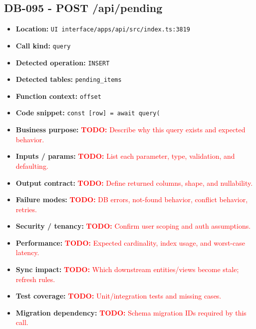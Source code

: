 \documentclass[11pt]{article}
\newcommand{\todoitem}[1]{\textcolor{red}{\textbf{TODO:} #1}}
\begin{document}
\subsection{DB-095 - POST /api/pending}
\begin{itemize}[leftmargin=1.5em]
\item \textbf{Location:} \texttt{UI interface/apps/api/src/index.ts:3819}
\item \textbf{Call kind:} \texttt{query}
\item \textbf{Detected operation:} \texttt{INSERT}
\item \textbf{Detected tables:} \texttt{pending\_items}
\item \textbf{Function context:} \texttt{offset}
\item \textbf{Code snippet:} \texttt{const [row] = await query(}
\item \textbf{Business purpose:} \todoitem{Describe why this query exists and expected behavior.}
\item \textbf{Inputs / params:} \todoitem{List each parameter, type, validation, and defaulting.}
\item \textbf{Output contract:} \todoitem{Define returned columns, shape, and nullability.}
\item \textbf{Failure modes:} \todoitem{DB errors, not-found behavior, conflict behavior, retries.}
\item \textbf{Security / tenancy:} \todoitem{Confirm user scoping and auth assumptions.}
\item \textbf{Performance:} \todoitem{Expected cardinality, index usage, and worst-case latency.}
\item \textbf{Sync impact:} \todoitem{Which downstream entities/views become stale; refresh rules.}
\item \textbf{Test coverage:} \todoitem{Unit/integration tests and missing cases.}
\item \textbf{Migration dependency:} \todoitem{Schema migration IDs required by this call.}
\end{itemize}
\end{document}
